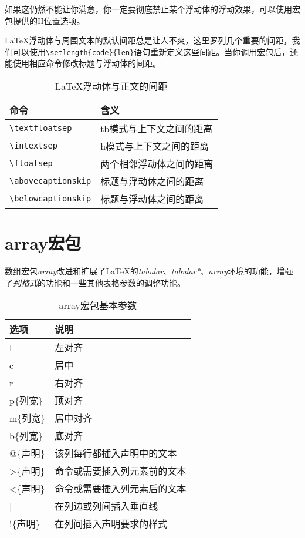 \begin{latex}
\usepackage[section]{placeins}
\end{latex}

如果这仍然不能让你满意，你一定要彻底禁止某个浮动体的浮动效果，可以使用宏包提供的H位置选项。

\begin{latex}
\usepackage{float}
\begin{figure}[H]
\begin{table}[H]
\end{latex}

\LaTeX{}浮动体与周围文本的默认间距总是让人不爽，这里罗列几个重要的间距，我们可以使用\lstinline|\setlength{code}{len}|语句重新定义这些间距。当你调用宏包后，还能使用相应命令修改标题与浮动体的间距。

\begin{table}
    \centering
    \caption{\LaTeX{}浮动体与正文的间距}
    \begin{tabular}{ll}
    \toprule
    命令 & 含义\\
    \midrule
    \verb|\textfloatsep| & tb模式与上下文之间的距离\\
    \verb|\intextsep| & h模式与上下文之间的距离\\
    \verb|\floatsep| & 两个相邻浮动体之间的距离\\
    \verb|\abovecaptionskip| & 标题与浮动体之间的距离\\
    \verb|\belowcaptionskip| & 标题与浮动体之间的距离\\
    \bottomrule
    \end{tabular}
\end{table}

\section{array宏包}

数组宏包\emph{array}改进和扩展了\LaTeX 的\emph{tabular、tabular*、array}环境的功能，增强了\emph{列格式}的功能和一些其他表格参数的调整功能。

\begin{table}[!htb]
    \centering
    \caption{array宏包基本参数}
    \begin{tabular}{ll}
    \toprule
    选项 & 说明 \\
    \midrule
    l & 左对齐 \\
    c & 居中 \\
    r & 右对齐 \\
    p\{列宽\} & 顶对齐 \\
    m\{列宽\} & 居中对齐 \\
    b\{列宽\} & 底对齐 \\
    @\{声明\} & 该列每行都插入声明中的文本 \\
    >\{声明\} & 命令或需要插入列元素前的文本 \\
    <\{声明\} & 命令或需要插入列元素后的文本 \\
    | & 在列边或列间插入垂直线 \\
    !\{声明\} & 在列间插入声明要求的样式 \\
    \bottomrule
    \end{tabular}
\end{table}

